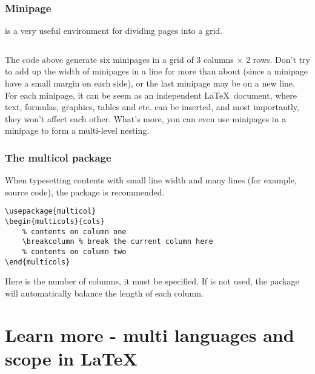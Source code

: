 \begin{frame}[fragile]
	\frametitle{Minipage}
	 is a very useful environment for dividing pages into a grid.
	\begin{example}
		\begin{multicols}{2}
			\inputminted[xleftmargin=1.5em]{latex}{examples/minipage.tex}
		\end{multicols}
	\end{example}
\end{frame}

\begin{frame}
	The code above generate six minipages in a grid of 3 columns $\times$ 2 rows. Don't try to add up the width of minipages in a line for more than about  (since a minipage have a small margin on each side), or the last minipage may be on a new line. \\[0.5em]
	For each minipage, it can be seem as an independent \LaTeX\ document, where text, formulas, graphics, tables and etc. can be inserted, and most importantly, they won't affect each other. What's more, you can even use minipages in a minipage to form a multi-level nesting. \\
\end{frame}

\begin{frame}[fragile]
	\frametitle{The multicol package}
	When typesetting contents with small line width and many lines (for example, source code), the  package is recommended.
	\begin{command}
		\begin{verbatim}
\usepackage{multicol}
\begin{multicols}{cols}
    % contents on column one
    \breakcolumn % break the current column here
    % contents on column two
\end{multicols}
		\end{verbatim}
	\end{command}
	Here  is the number of columns, it must be specified. If \LC{\breakcolumn} is not used, the  package will automatically balance the length of each column.
\end{frame}

\section{Learn more - multi languages and scope in \LaTeX}
\begin{frame}
\end{frame}

